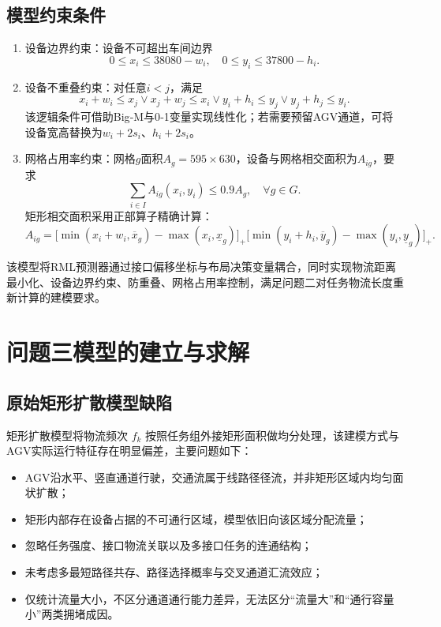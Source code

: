 \documentclass[12pt,a4paper]{article}
\begin{document}
	\subsection{模型约束条件}
	\begin{enumerate}
	\item 设备边界约束：设备不可超出车间边界
	\[
	0 \leq x_{i} \leq 38080-w_{i},\quad 0 \leq y_{i} \leq 37800-h_{i}.
	\]
	
	\item 设备不重叠约束：对任意$i<j$，满足
	\[
	x_{i}+w_{i} \leq x_{j} \vee x_{j}+w_{j} \leq x_{i} \vee y_{i}+h_{i} \leq y_{j} \vee y_{j}+h_{j} \leq y_{i}.
	\]
	该逻辑条件可借助Big‑M与0‑1变量实现线性化；若需要预留AGV通道，可将设备宽高替换为$w_{i}+2s_i$、$h_{i}+2s_i$。
	
	\item 网格占用率约束：网格$g$面积$A_g=595\times 630$，设备与网格相交面积为$A_{ig}$，要求
	\[
	\sum_{i \in I} A_{ig}(x_i,y_i) \leq 0.9 A_g,\quad \forall g\in G.
	\]
	矩形相交面积采用正部算子精确计算：
	\[
	A_{ig}=\big[\min\left(x_{i}+w_{i},\overline{x}_{g}\right)-\max\left(x_{i},\underline{x}_{g}\right)\big]_{+}\big[\min\left(y_{i}+h_{i},\overline{y}_{g}\right)-\max\left(y_{i},\underline{y}_{g}\right)\big]_{+}.
	\]
\end{enumerate}


	该模型将RML预测器通过接口偏移坐标与布局决策变量耦合，同时实现物流距离最小化、设备边界约束、防重叠、网格占用率控制，满足问题二对任务物流长度重新计算的建模要求。

	
	\section{问题三模型的建立与求解}
	\subsection{原始矩形扩散模型缺陷}
	矩形扩散模型将物流频次 $f_k$ 按照任务组外接矩形面积做均分处理，该建模方式与AGV实际运行特征存在明显偏差\cite{chen2025}，主要问题如下：
	\begin{itemize}
		\item AGV沿水平、竖直通道行驶，交通流属于线路径径流，并非矩形区域内均匀面状扩散；
		\item 矩形内部存在设备占据的不可通行区域，模型依旧向该区域分配流量；
		\item 忽略任务强度、接口物流关联以及多接口任务的连通结构；
		\item 未考虑多最短路径共存、路径选择概率与交叉通道汇流效应；
		\item 仅统计流量大小，不区分通道通行能力差异，无法区分“流量大”和“通行容量小”两类拥堵成因。
	\end{itemize}
	
\end{document}
